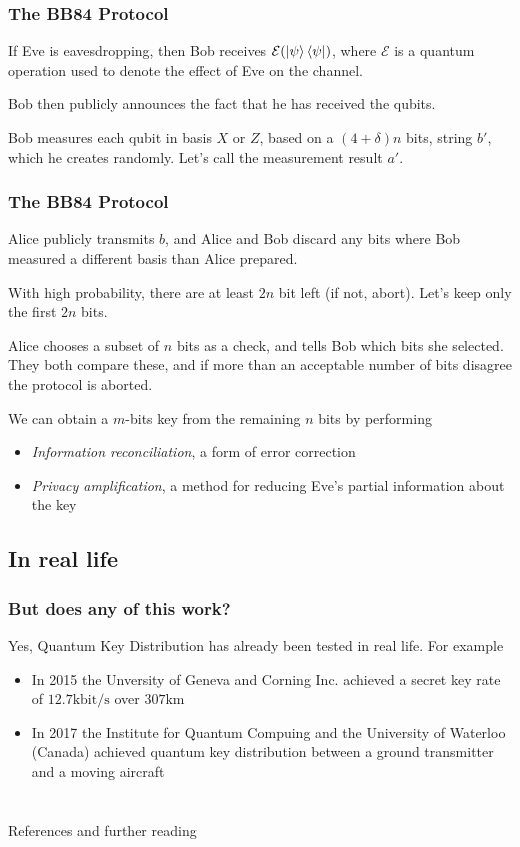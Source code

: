 \documentclass{beamer}
\begin{document}
  \begin{frame}
    \frametitle{The BB84 Protocol}
    If Eve is eavesdropping, then Bob receives $\mathcal E(\ket{\psi}\bra{\psi})$, where
    $\mathcal E$ is a quantum operation used to denote the effect of Eve on the channel.

    \pause
    Bob then publicly announces the fact that he has received the qubits.

    \pause
    Bob measures each qubit in basis $X$ or $Z$, based on a $(4+\delta)n$ bits,
    string $b'$, which he creates randomly. Let's call the measurement result $a'$.
  \end{frame}

  \begin{frame}
    \frametitle{The BB84 Protocol}
    Alice publicly transmits $b$, and Alice and Bob discard any bits where Bob measured
    a different basis than Alice prepared.

    \pause
    With high probability, there are at least $2n$ bit left (if not, abort). Let's keep only the first $2n$ bits.

    \pause
    Alice chooses a subset of $n$ bits as a check, and tells Bob which bits she selected.
    They both compare these, and if more than an acceptable number of bits disagree the protocol is aborted.

    \pause
    We can obtain a $m$-bits key from the remaining $n$ bits by performing
    \begin{itemize}
      \item \textit{Information reconciliation}, a form of error correction
      \item \textit{Privacy amplification}, a method for reducing Eve's partial information about the key
    \end{itemize}
  \end{frame}

  \subsection{In real life}
  \begin{frame}
    \frametitle{But does any of this work?}
    Yes, Quantum Key Distribution has already been tested in real life.
    For example
    \begin{itemize}
      \item In 2015 the Unversity of Geneva and Corning Inc. achieved a secret key
            rate of $12.7 \mathrm{kbit/s}$ over $307 \mathrm{km}$ \cite{qkd}
      \item In 2017 the Institute for Quantum Compuing and the University of Waterloo (Canada) achieved
            quantum key distribution between a ground transmitter and a moving aircraft \cite{airborne}
    \end{itemize}
  \end{frame}
  
  \section*{}
  \begin{frame}{References and further reading}
    \nocite{*}
    
    
  \end{frame}
\end{document}
